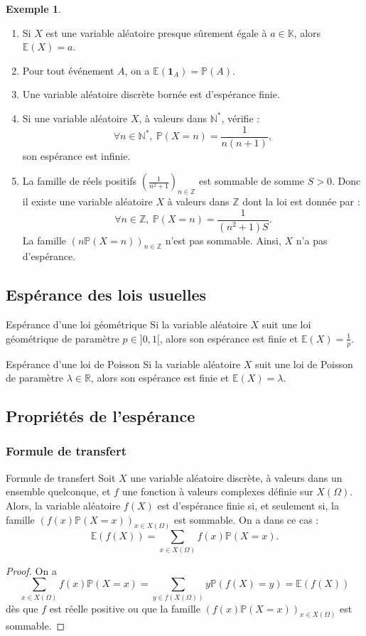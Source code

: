 \documentclass[french]{article}
\renewcommand{\P}{\mathbb{P}}
\newcommand{\N}{\mathbb{N}}
\newcommand{\Z}{\mathbb{Z}}
\newcommand{\R}{\mathbb{R}}
\newcommand{\K}{\mathbb{K}}
\newcommand{\st}{^*}
\newcommand{\E}{\mathbb{E}}
\theoremstyle{plain}
\theoremstyle{definition}
\newtheorem*{ex}{Exemple}
\theoremstyle{remark}
\begin{document}
\begin{ex}
	\begin{enumerate}
		\item Si $X$ est une variable aléatoire presque sûrement égale à $a\in\K$, alors $\E(X)=a$.
		\item Pour tout événement $A$, on a $\E(\textbf{1}_A)=\P(A)$.
		\item Une variable aléatoire discrète bornée est d'espérance finie.
		\item Si une variable aléatoire $X$, à valeurs dans $\N\st$, vérifie : $$\forall n\in\N\st,\ \P(X=n)=\frac{1}{n(n+1)},$$ son espérance est infinie.
		\item La famille de réels positifs $\displaystyle\left(\frac{1}{n^2+1}\right)_{n\in\Z}$ est sommable de somme $S>0$. Donc il existe une variable aléatoire $X$ à valeurs dans $\Z$ dont la loi est donnée par :
		$$\forall n\in\Z,\ \P(X=n)=\frac{1}{(n^2+1)S}.$$ La famille $(n\P(X=n))_{n\in\Z}$ n'est pas sommable. Ainsi, $X$ n'a pas d'espérance.
	\end{enumerate}
\end{ex}

\subsection{Espérance des lois usuelles}

\begin{thm}{Espérance d'une loi géométrique}%
	Si la variable aléatoire $X$ suit une loi géométrique de paramètre $p\in]0,1[$, alors son espérance est finie et $\E(X)=\displaystyle\frac{1}{p}$.
\end{thm}

\begin{thm}{Espérance d'une loi de Poisson}%
	Si la variable aléatoire $X$ suit une loi de Poisson de paramètre $\lambda\in\R$, alors son espérance est finie et $\E(X)=\lambda$.
\end{thm}

\subsection{Propriétés de l'espérance}

\subsubsection*{Formule de transfert}

\begin{thm}{Formule de transfert}%
	Soit $X$ une variable aléatoire discrète, à valeurs dans un ensemble quelconque, et $f$ une fonction à valeurs complexes définie sur $X(\Omega)$. Alors, la variable aléatoire $f(X)$ est d'espérance finie si, et seulement si, la famille $(f(x)\P(X=x))_{x\in X(\Omega)}$ est sommable. On a dans ce cas :
	$$\E(f(X))=\sum_{x\in X(\Omega)}f(x)\P(X=x).$$
\end{thm}
\begin{proof}
	On a
	$$\sum_{x\in X(\Omega)}f(x)\P(X=x)=\sum_{y\in f(X(\Omega))}y\P(f(X)=y)=\E(f(X))$$ dès que $f$ est réelle positive ou que la famille $(f(x)\P(X=x))_{x\in X(\Omega)}$ est sommable.
\end{proof}
\end{document}
